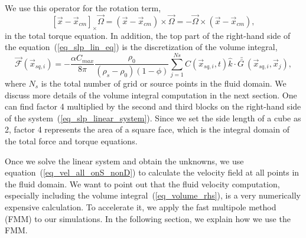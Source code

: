 We use this operator for the rotation term, 
 \[
  [\vec{x} - \vec{x}_{cm}]_{\times}  \vec{\Omega}
   = (\vec{x} - \vec{x}_{cm}) \times \vec{\Omega}
  = - \vec{\Omega} \times  (\vec{x} - \vec{x}_{cm}),
  \]
in the total torque equation.
In addition, the top part of the right-hand side of the equation~(\ref{eq_slp_lin_eq}) is the discretization of the volume integral,
\begin{equation}
	{\vec{\mathcal{F}}} (\vec{x}_{sq,i}) = 
	-\frac{ \alpha C_{max}}{8\pi } \frac{\rho_0}{(\rho_s - \rho_0)(1-\phi)} 
   \sum_{j= 1}^{Ns}  C \left(\vec{x}_{sq,i},  t \right) \hat{k} \cdot
   \bar{\bar{G \ }}(\vec{x}_{sq, i}, \vec{x}_{j} ),
\label{eq_volume_rhs}
\end{equation}
   where $N_s$ is the total number of grid or source points in the fluid domain. We discuss more details of the volume integral computation in the next section. 
  One can find factor 4 multiplied by the second and third blocks on the right-hand side of the system~(\ref{eq_slp_linear_system}). 
 Since we set the side length of a cube as 2, factor 4 represents the area of a square face, which is the integral domain of the total force and torque equations. 
 \par
 Once we solve the linear system and obtain the unknowns, we use equation~(\ref{eq_vel_all_onS_nonD}) to calculate the velocity field at all points in the fluid domain. We want to point out that the fluid velocity computation, especially including the volume integral~(\ref{eq_volume_rhs}), is a very numerically expensive calculation. To accelerate it, we apply the fast multipole method (FMM) to our simulations. In the following section, we explain how we use the FMM. 
